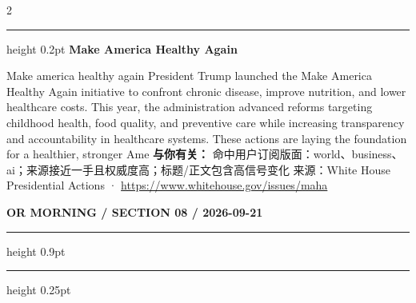 \documentclass[10.5pt]{ctexart}
\begin{document}
\begin{multicols}{2}
\vspace{2mm}
\hrule height 0.2pt
\vspace{2mm}
{\large\bfseries Make America Healthy Again}\par
Make america healthy again President Trump launched the Make America Healthy Again initiative to confront chronic disease, improve nutrition, and lower healthcare costs. This year, the administration advanced reforms targeting childhood health, food quality, and preventive care while increasing transparency and accountability in healthcare systems. These actions are laying the foundation for a healthier, stronger Ame
\textbf{与你有关：} 命中用户订阅版面：world、business、ai；来源接近一手且权威度高；标题/正文包含高信号变化
{\footnotesize\color{ormuted} 来源：White House Presidential Actions · \url{https://www.whitehouse.gov/issues/maha}}
\end{multicols}
\newpage
{\small\bfseries OR MORNING / SECTION 08 / 2026-09-21}
\vspace{2mm}
\hrule height 0.9pt
\vspace{1.5mm}
\hrule height 0.25pt
\vspace{4mm}
\end{document}
